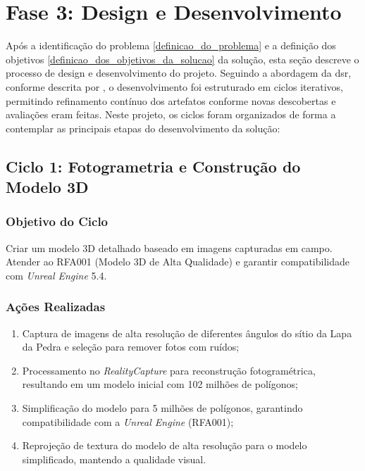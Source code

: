 \section{Fase 3: Design e Desenvolvimento}\label{sec: Fase 3 design e desenvolvimento}
Após a identificação do problema \ref{definicao_do_problema} e a definição dos objetivos \ref{definicao_dos_objetivos_da_solucao} da solução, esta seção descreve o processo de design e desenvolvimento do projeto. Seguindo a abordagem da \gls{dsr}, conforme descrita por \cite{peffers2007design}, o desenvolvimento foi estruturado em ciclos iterativos, permitindo refinamento contínuo dos artefatos conforme novas descobertas e avaliações eram feitas.
Neste projeto, os ciclos foram organizados de forma a contemplar as principais etapas do desenvolvimento da solução:

\subsection*{Ciclo 1: Fotogrametria e Construção do Modelo 3D} \label{subsec:ciclo1}

\subsubsection*{Objetivo do Ciclo}
Criar um modelo 3D detalhado baseado em imagens capturadas em campo. Atender ao RFA001 (Modelo 3D de Alta Qualidade) e garantir compatibilidade com \textit{Unreal Engine} 5.4. 

\subsubsection*{Ações Realizadas}
\begin{enumerate}
    \item Captura de imagens de alta resolução de diferentes ângulos do sítio da Lapa da Pedra e seleção para remover fotos com ruídos;
    \item Processamento no \textit{RealityCapture} para reconstrução fotogramétrica, resultando em um modelo inicial com 102 milhões de polígonos;
    \item Simplificação do modelo para 5 milhões de polígonos, garantindo compatibilidade com a \textit{Unreal Engine} (RFA001);
    \item Reprojeção de textura do modelo de alta resolução para o modelo simplificado, mantendo a qualidade visual.
\end{enumerate}

